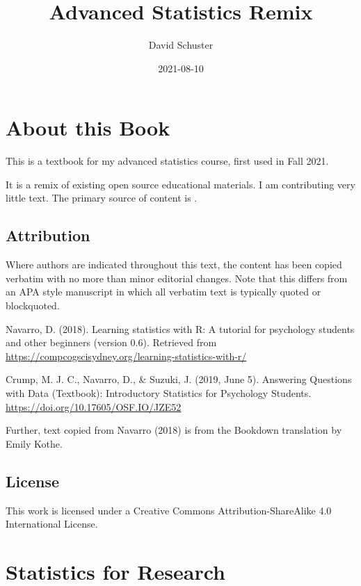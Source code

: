 \documentclass[
]{book}
\title{Advanced Statistics Remix}
\author{David Schuster}
\date{2021-08-10}
\begin{document}
\maketitle

{
\setcounter{tocdepth}{1}
\tableofcontents
}
\hypertarget{about-this-book}{%
\chapter*{About this Book}\label{about-this-book}}

This is a textbook for my advanced statistics course, first used in Fall 2021.

It is a remix of existing open source educational materials. I am contributing very little text. The primary source of content is \citet{Navarro2018}.

\hypertarget{attribution}{%
\section*{Attribution}\label{attribution}}

Where authors are indicated throughout this text, the content has been copied verbatim with no more than minor editorial changes. Note that this differs from an APA style manuscript in which all verbatim text is typically quoted or blockquoted.

Navarro, D. (2018). Learning statistics with R: A tutorial for psychology students and other beginners (version 0.6). Retrieved from \url{https://compcogscisydney.org/learning-statistics-with-r/}

Crump, M. J. C., Navarro, D., \& Suzuki, J. (2019, June 5). Answering Questions with Data (Textbook): Introductory Statistics for Psychology Students. \url{https://doi.org/10.17605/OSF.IO/JZE52}

Further, text copied from Navarro (2018) is from the Bookdown translation by Emily Kothe.

\hypertarget{license}{%
\section*{License}\label{license}}

This work is licensed under a Creative Commons Attribution-ShareAlike 4.0 International License.

\hypertarget{statistics-for-research}{%
\chapter{Statistics for Research}\label{statistics-for-research}}
\end{document}
